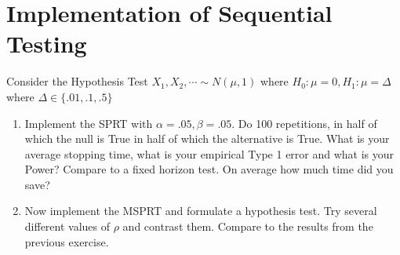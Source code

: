 \documentclass[11pt]{article}
\newcommand{\1}[1]{\mathbf{1}\left\{#1\right\}}
\begin{document}
\section{Implementation of Sequential Testing}
Consider the Hypothesis Test $X_1, X_2, \cdots \sim N(\mu, 1)$ where $H_0: \mu = 0, H_1: \mu = \Delta$ where $\Delta\in \{.01, .1, .5\}$ 
\begin{enumerate}
    \item Implement the SPRT with $\alpha=.05, \beta=.05$. Do 100 repetitions, in half of which the null is True in half of which the alternative is True. What is your average stopping time, what is your empirical Type 1 error and what is your Power? Compare to a fixed horizon test. On average how much time did you save?
    \item Now implement the MSPRT and formulate a hypothesis test. Try several different values of $\rho$ and contrast them. Compare to the results from the previous exercise. 
\end{enumerate}






\end{document}
